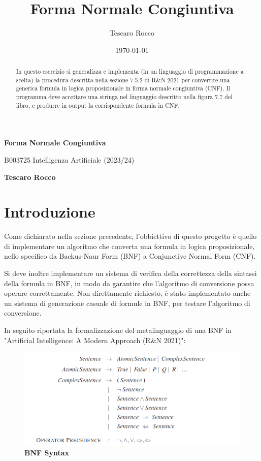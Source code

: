 \documentclass{article} %
\title{Forma Normale Congiuntiva}
\author{Tescaro Rocco}
\date{\today}
\begin{document}
\thispagestyle{plain}
\begin{center}
    \Large
    \textbf{Forma Normale Congiuntiva}
    
    \vspace{0.2cm}
    \large
    B003725 Intelligenza Artificiale (2023/24)
    
    \vspace{0.4cm}
    \textbf{Tescaro Rocco}
    \vspace{0.2cm}
\end{center}

\begin{abstract}
    
In questo esercizio si generalizza e implementa (in un linguaggio di programmazione a scelta) la procedura descritta nella sezione 7.5.2 di R\&N 2021 per convertire una generica formula in logica proposizionale in forma normale congiuntiva (CNF). Il programma deve accettare una stringa nel linguaggio descritto nella figura 7.7 del libro, e produrre in output la corrispondente formula in CNF.

\end{abstract}

\section*{Introduzione} 

Come dichiarato nella sezione precedente, l'obbiettivo di questo progetto è quello di implementare un algoritmo che converta una formula in logica proposizionale, nello specifico da Backus-Naur Form (BNF) a Conjunctive Normal Form (CNF).

Si deve inoltre implementare un sistema di verifica della correttezza della sintassi della formula in BNF, in modo da garantire che l'algoritmo di conversione possa operare correttamente. Non direttamente richiesto, è stato implementato anche un sistema di generazione casuale di formule in BNF, per testare l'algoritmo di conversione.

In seguito riportata la formalizzazione del metalinguaggio di una BNF in "Artificial Intelligence: A Modern Approach (R\&N 2021)":

\begin{figure}[htbp]
    \caption{\textbf{BNF Syntax}}
    \centering
    \includegraphics[width=\linewidth]{bnf}
\end{figure}
\end{document}
